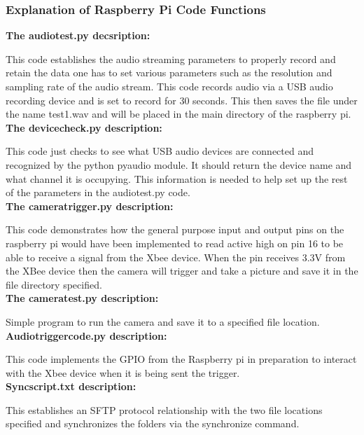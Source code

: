 	\subsubsection{Explanation of Raspberry Pi Code Functions}
		\noindent\textbf{The audiotest.py decsription: }
		\par This code establishes the audio streaming parameters to properly record and retain the data one has to set various parameters such as the resolution and sampling rate of the audio stream. This code records audio via a USB audio recording device and is set to record for 30 seconds. This then saves the file under the name test1.wav and will be placed in the main directory of the raspberry pi. \\
		
		\noindent\textbf{ The devicecheck.py description:}
		\par This code just checks to see what USB audio devices are connected and recognized by the python pyaudio module. It should return the device name and what channel it is occupying. This information is needed to help set up the rest of the parameters in the audiotest.py code.\\
		
		\noindent\textbf{ The cameratrigger.py description:}
		\par This code demonstrates how the general purpose input and output pins on the raspberry pi would have been implemented to read active high on pin 16 to be able to receive a signal from the Xbee device. When the pin receives 3.3V from the XBee device then the camera will trigger and take a picture and save it in the file directory specified. \\
		
		\noindent\textbf{ The cameratest.py description:}
		\par Simple program to run the camera and save it to a specified file location.\\
		
		\noindent\textbf{ Audiotriggercode.py description:}
		\par This code implements the GPIO from the Raspberry pi in preparation to interact with the Xbee device when it is being sent the trigger.\\
	
		\noindent\textbf{ Syncscript.txt description:}
		\par This establishes an SFTP protocol relationship with the two file locations specified and synchronizes the folders via the synchronize command.\\
	
